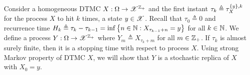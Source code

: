 \documentclass[letterpaper,10pt,english]{article}
\begin{document}
\begin{rem} 
Consider a homogeneous DTMC $X:\Omega\to\mathscr{X}^{\mathbb{Z}_+}$ and the first instant $\tau_k \triangleq \tau_X^{\left\{y\right\},k}$ for the process $X$ to hit $k$ times, a state $y\in\mathscr{X}$. 
Recall that $\tau_0 \triangleq 0$ and recurrence time $H_k \triangleq \tau_k - \tau_{k-1} = \inf\left\{n \in \mathbb{N}: X_{\tau_{k-1}+n}= y\right\}$ for all $k \in \mathbb{N}$.  
We define a process $Y:\Omega\to\mathscr{X}^{\mathbb{Z}_+}$ where $Y_m \triangleq X_{\tau_k + m}$ for all $m \in \mathbb{Z}_+$. 
If $\tau_k$ is almost surely finite, then it is a stopping time with respect to process $X$. 
Using strong Markov property of DTMC $X$, we will show that $Y$ is a stochastic replica of $X$ with $X_0 = y$. 
\end{rem}

\end{document}
